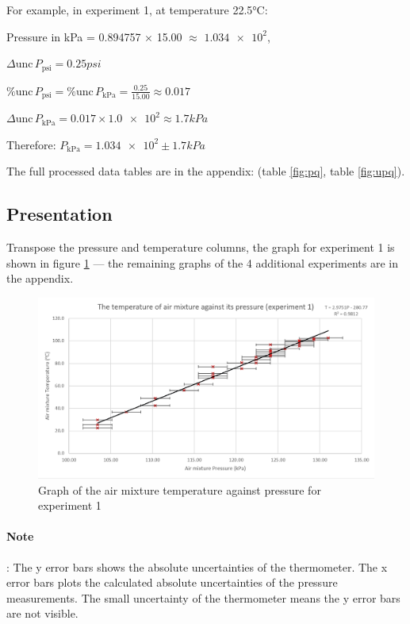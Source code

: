 \documentclass[a4paper,12pt]{article}
\newcommand{\absun}{\Delta \text{unc}\,}
\newcommand{\relun}{\% \text{unc}\,}
\begin{document}
For example, in experiment 1, at temperature 22.5$\si{\celsius}$:

Pressure in kPa = 0.894757 $\times$ 15.00 $\approx$ $\num{1.034e+2}$,

$\absun P_{\text{psi}} = 0.25\si{psi}$

$\relun P_{\text{psi}} = \relun P_{\text{kPa}} =  \frac{0.25}{15.00} \approx 0.017$

$\absun P_{\text{kPa}} = 0.017 \times \num{1.0e+2} \approx \num{1.7} \si{kPa}$

Therefore: $P_{\text{kPa}} = \num{1.034e+2} \pm \num{1.7} \si{kPa}$

The full processed data tables are in the appendix: (table \ref{fig:pq}, table \ref{fig:upq}).

\subsection{Presentation}

Transpose the pressure and temperature columns, the graph for experiment 1 is shown in figure \ref{fig:t1} --- the remaining graphs of the 4 additional experiments are in the appendix.

\begin{figure}[H]
    \centering
    \includegraphics[width=\textwidth]{assets/graph1.png}
    \caption{Graph of the air mixture temperature against pressure for experiment 1}
    \label{fig:t1}
\end{figure}

\paragraph{Note}: The y error bars shows the absolute uncertainties of the thermometer. The x error bars plots the calculated absolute uncertainties of the pressure measurements. The small uncertainty of the thermometer means the y error bars are not visible.
\end{document}
